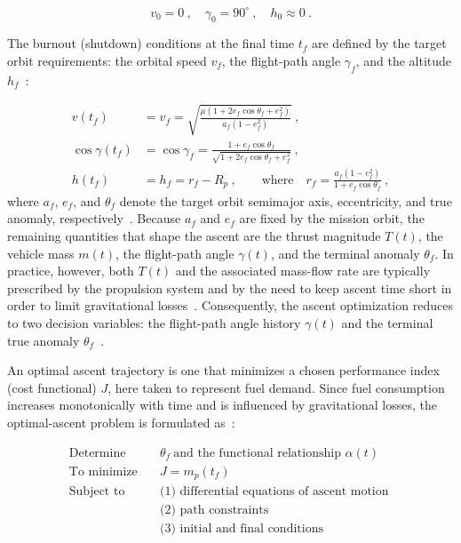 \begin{equation}
v_0 = 0 \ ,\quad \gamma_0 = 90^\circ \ ,\quad h_0 \approx 0 \ .
\label{eq:initial_conditions}
\end{equation}

The burnout (shutdown) conditions at the final time $t_f$ are defined by the target orbit requirements: the orbital speed $v_f$, the flight-path angle $\gamma_f$, and the altitude $h_f$~\cite{Edberg}:

\begin{equation}
\begin{aligned}
v(t_f) &= v_f = \sqrt{\frac{\mu\left(1+2e_f\cos\theta_f+e_f^2\right)}{a_f\left(1-e_f^2\right)}} \ ,\\
\cos\gamma(t_f) &= \cos\gamma_f = \frac{1+e_f\cos\theta_f}{\sqrt{1+2e_f\cos\theta_f+e_f^2}} \ ,\\
h(t_f) &= h_f = r_f - R_p \ ,\qquad \text{where}\quad r_f=\frac{a_f\left(1-e_f^2\right)}{1+e_f\cos\theta_f} \ ,
\end{aligned}
\end{equation}
where $a_f$, $e_f$, and $\theta_f$ denote the target orbit semimajor axis, eccentricity, and true anomaly, respectively~\cite{Edberg}. Because $a_f$ and $e_f$ are fixed by the mission orbit, the remaining quantities that shape the ascent are the thrust magnitude $T(t)$, the vehicle mass $m(t)$, the flight-path angle $\gamma(t)$, and the terminal anomaly $\theta_f$. In practice, however, both $T(t)$ and the associated mass-flow rate are typically prescribed by the propulsion system and by the need to keep ascent time short in order to limit gravitational losses~\cite{Ulrich}. Consequently, the ascent optimization reduces to two decision variables: the flight-path angle history $\gamma(t)$ and the terminal true anomaly $\theta_f$~\cite{Ulrich}.

An optimal ascent trajectory is one that minimizes a chosen performance index (cost functional) $J$, here taken to represent fuel demand. Since fuel consumption increases monotonically with time and is influenced by gravitational losses, the optimal-ascent problem is formulated as~\cite{Ulrich}:

\begin{equation}
\label{eq:optimal_ascent_problem}
\begin{aligned}
\text{Determine} \quad & \theta_f \ \text{and the functional relationship } \alpha(t) \\
\text{To minimize} \quad & J = m_p(t_f) \\
\text{Subject to} \quad
& \text{(1) differential equations of ascent motion } \\
& \text{(2) path constraints} \\
& \text{(3) initial and final conditions}
\end{aligned}
\end{equation}

